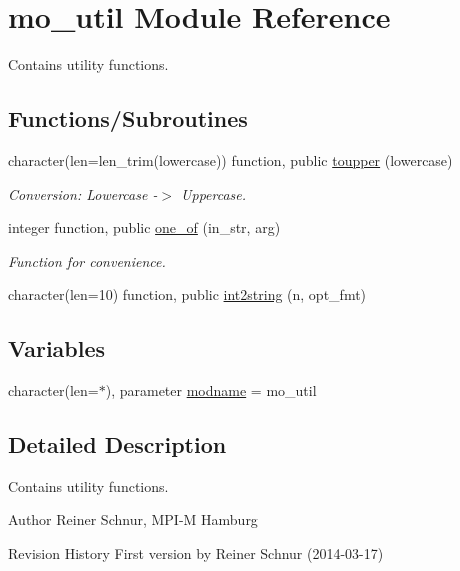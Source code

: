 \hypertarget{namespacemo__util}{}\section{mo\+\_\+util Module Reference}
\label{namespacemo__util}


Contains utility functions.  


\subsection*{Functions/\+Subroutines}
\begin{DoxyCompactItemize}
\item 
character(len=len\+\_\+trim(lowercase)) function, public \hyperlink{namespacemo__util_a4a244c25226ff9221cdd725d0964c118}{toupper} (lowercase)
\begin{DoxyCompactList}\small\item\em Conversion\+: Lowercase -\/$>$ Uppercase. \end{DoxyCompactList}\item 
integer function, public \hyperlink{namespacemo__util_a7a24a8dc4b724911d99757348cc8ecbe}{one\+\_\+of} (in\+\_\+str, arg)
\begin{DoxyCompactList}\small\item\em Function for convenience. \end{DoxyCompactList}\item 
character(len=10) function, public \hyperlink{namespacemo__util_a2adc90dbfdafeab9097559d6fd71c06e}{int2string} (n, opt\+\_\+fmt)
\end{DoxyCompactItemize}
\subsection*{Variables}
\begin{DoxyCompactItemize}
\item 
character(len=$\ast$), parameter \hyperlink{namespacemo__util_a4026980f9290fc6203c551efed0cd9e0}{modname} = \textquotesingle{}mo\+\_\+util\textquotesingle{}
\end{DoxyCompactItemize}


\subsection{Detailed Description}
Contains utility functions. 

\begin{DoxyAuthor}{Author}
Reiner Schnur, M\+P\+I-\/\+M Hamburg
\end{DoxyAuthor}
\begin{DoxyParagraph}{Revision History}
First version by Reiner Schnur (2014-\/03-\/17) 
\end{DoxyParagraph}


